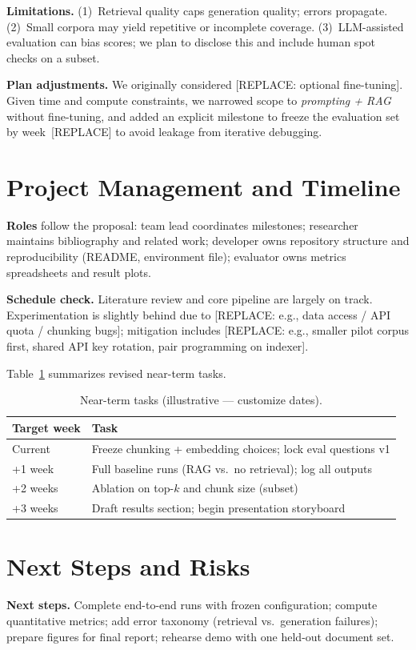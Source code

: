 \documentclass[11pt,a4paper]{article}
\begin{document}
\textbf{Limitations.} (1)~Retrieval quality caps generation quality; errors propagate. (2)~Small corpora may yield repetitive or incomplete coverage. (3)~LLM-assisted evaluation can bias scores; we plan to disclose this and include human spot checks on a subset.

\textbf{Plan adjustments.} We originally considered [REPLACE: optional fine-tuning]. Given time and compute constraints, we narrowed scope to \emph{prompting + RAG} without fine-tuning, and added an explicit milestone to freeze the evaluation set by week~[REPLACE] to avoid leakage from iterative debugging.

\section{Project Management and Timeline}
\textbf{Roles} follow the proposal: team lead coordinates milestones; researcher maintains bibliography and related work; developer owns repository structure and reproducibility (README, environment file); evaluator owns metrics spreadsheets and result plots.

\textbf{Schedule check.} Literature review and core pipeline are largely on track. Experimentation is slightly behind due to [REPLACE: e.g., data access / API quota / chunking bugs]; mitigation includes [REPLACE: e.g., smaller pilot corpus first, shared API key rotation, pair programming on indexer].

Table~\ref{tab:timeline} summarizes revised near-term tasks.

\begin{table}[h]
\centering
\caption{Near-term tasks (illustrative --- customize dates).}
\label{tab:timeline}
\begin{tabular}{@{}ll@{}}
\toprule
Target week & Task \\
\midrule
Current & Freeze chunking + embedding choices; lock eval questions v1 \\
+1 week & Full baseline runs (RAG vs.\ no retrieval); log all outputs \\
+2 weeks & Ablation on top-$k$ and chunk size (subset) \\
+3 weeks & Draft results section; begin presentation storyboard \\
\bottomrule
\end{tabular}
\end{table}

\section{Next Steps and Risks}
\textbf{Next steps.} Complete end-to-end runs with frozen configuration; compute quantitative metrics; add error taxonomy (retrieval vs.\ generation failures); prepare figures for final report; rehearse demo with one held-out document set.
\end{document}
